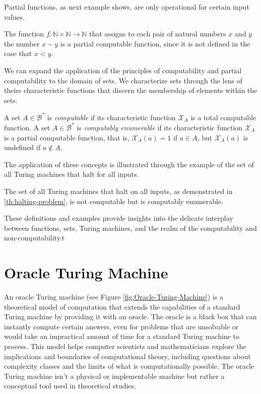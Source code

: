 Partial functions, as next example shows, are only operational for certain input values. 

\begin{example}
The function $f: \mathbb{N} \times \mathbb{N} \rightarrow \mathbb{N}$ that assigns to each pair of natural numbers $x$ and $y$ the number $x - y$ is a partial computable function, since it is not defined in the case that $x < y$.
\end{example}

We can expand the application of the principles of computability and partial computability to the domain of sets. We characterize sets through the lens of theirs characteristic functions that discern the membership of elements within the sets.

\begin{definition}
A set $A \in \mathcal{B}^\ast$ is \emph{computable} if its characteristic function $\mathcal{X}_A$ is a total computable function. A set $A \in \mathcal{B}^\ast$ is \emph{computably enumerable} if its characteristic function $\mathcal{X}_A$ is a partial computable function, that is, $\mathcal{X}_A(a) = 1$ if $a \in A$, but $\mathcal{X}_A(a)$ is undefined if $a \not\in A$.
\end{definition}

The application of these concepts is illustrated through the example of the set of all Turing machines that halt for all inputs.

\begin{example}
The set of all Turing machines that halt on all inputs, as demonstrated in \ref{th:halting-problem}, is not computable but is computably enumerable.
\end{example}

These definitions and examples provide insights into the delicate interplay between functions, sets, Turing machines, and the realm of the computability and non-computability.t

%
%

\section{Oracle Turing Machine}
\label{sec:oracle_turing_machine}

An oracle Turing machine (see Figure \ref{fig:Oracle-Turing-Machine}) is a theoretical model of computation that extends the capabilities of a standard Turing machine by providing it with an oracle. The oracle is a black box that can instantly compute certain answers, even for problems that are unsolvable or would take an impractical amount of time for a standard Turing machine to process. This model helps computer scientists and mathematicians explore the implications and boundaries of computational theory, including questions about complexity classes and the limits of what is computationally possible. The oracle Turing machine isn't a physical or implementable machine but rather a conceptual tool used in theoretical studies.

